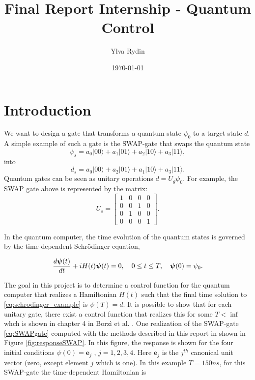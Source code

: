 \documentclass[11pt]{article}
\begin{document}
\title{Final Report Internship - Quantum Control}
\author{Ylva Rydin}


\date{\today}

\maketitle
\section{Introduction}

We want to design a gate that transforms a quantum state $\psi_0$ to a target state $d$. 
A simple example of such a gate is the SWAP-gate that swaps the quantum state  
%
\[
\psi_s =  a_0 |00\rangle + a_1 |01\rangle + a_2 |10\rangle + a_3 |11 \rangle, 
\]
%
into
%
\[
d_s =  a_0 |00\rangle + a_2 |01\rangle + a_1 |10\rangle + a_3 |11 \rangle. 
\]
%
Quantum gates can be seen as unitary operations $d = U_g \psi_0.$ For example, the SWAP gate above is represented by the matrix:
%
\begin{equation} \label{eq:SWAPgate}
U_s =
\begin{bmatrix}
1 & 0 & 0 & 0 \\
0 & 0 & 1 & 0 \\
0 & 1 & 0 & 0 \\
0 & 0 & 0 & 1
\end{bmatrix}.
\end{equation}

In the quantum computer, the time evolution of the quantum states is governed by the time-dependent Schr\"odinger equation,

\begin{equation}\label{eq:schrodinger_example}
\frac{d \boldsymbol{\psi}(t)}{dt} + iH(t)\boldsymbol{\psi}(t)=0,\quad 0\leq t\leq T, \quad \boldsymbol{\psi} (0) = \psi_0.
\end{equation}

The goal in this project is to determine a control function for the quantum computer that realizes a Hamiltonian $H(t)$ such that the final time solution to \eqref{eq:schrodinger_example} is $\psi(T) = d$. It is possible to show that for each unitary gate, there exist a control function that realizes this for some $T < \inf $ whch is shown in chapter 4 in Borzì et al. \cite{Borzi-17}. One realization of the SWAP-gate \eqref{eq:SWAPgate}  computed with the methods described in this report in shown in Figure \ref{fig:responseSWAP}. In this figure, the response is shown for the four initial conditions $\psi(0) = \mathbf{e}_j$ , $j = 1,2,3, 4$. Here $\mathbf{e}_j$ is the $j^{th}$ canonical unit vector (zero, except element $j$ which is one). In this example $T = 150 ns$, for this SWAP-gate the time-dependent Hamiltonian is
\end{document}
